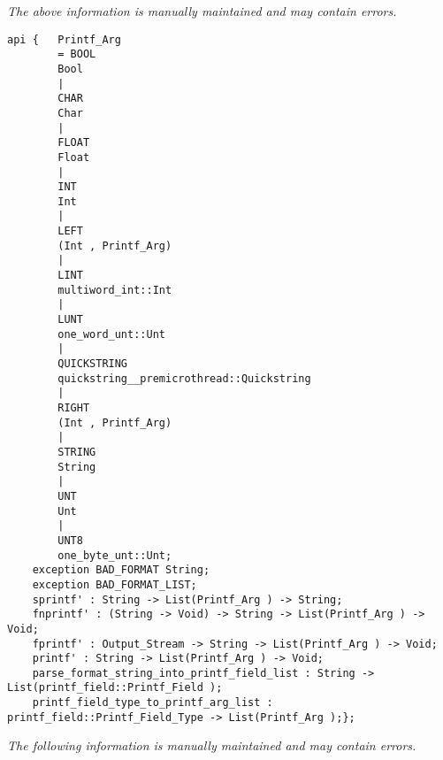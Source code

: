 \label{api:Sfprintf}

{\tiny \it The above information is manually maintained and may contain errors.}
\begin{verbatim}
api {   Printf_Arg
        = BOOL
        Bool
        |
        CHAR
        Char
        |
        FLOAT
        Float
        |
        INT
        Int
        |
        LEFT
        (Int , Printf_Arg)
        |
        LINT
        multiword_int::Int
        |
        LUNT
        one_word_unt::Unt
        |
        QUICKSTRING
        quickstring__premicrothread::Quickstring
        |
        RIGHT
        (Int , Printf_Arg)
        |
        STRING
        String
        |
        UNT
        Unt
        |
        UNT8
        one_byte_unt::Unt;
    exception BAD_FORMAT String;
    exception BAD_FORMAT_LIST;
    sprintf' : String -> List(Printf_Arg ) -> String;
    fnprintf' : (String -> Void) -> String -> List(Printf_Arg ) -> Void;
    fprintf' : Output_Stream -> String -> List(Printf_Arg ) -> Void;
    printf' : String -> List(Printf_Arg ) -> Void;
    parse_format_string_into_printf_field_list : String -> List(printf_field::Printf_Field );
    printf_field_type_to_printf_arg_list : printf_field::Printf_Field_Type -> List(Printf_Arg );};
\end{verbatim}
{\tiny \it The following information is manually maintained and may contain errors.}

